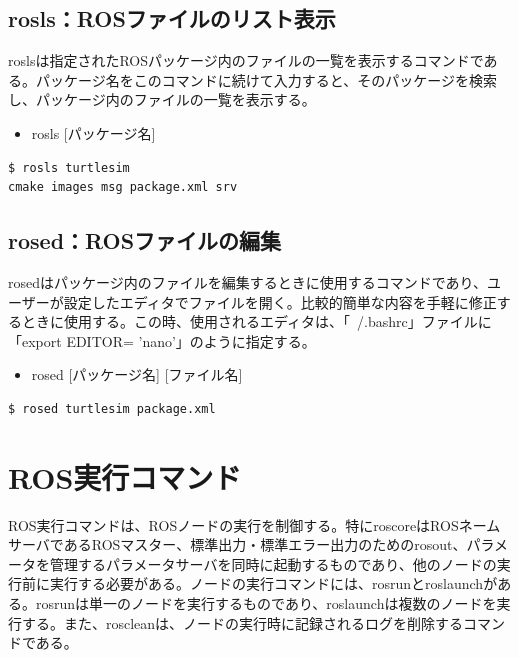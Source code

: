 \subsection{rosls：ROSファイルのリスト表示}

roslsは指定されたROSパッケージ内のファイルの一覧を表示するコマンドである。パッケージ名をこのコマンドに続けて入力すると、そのパッケージを検索し、パッケージ内のファイルの一覧を表示する。

\begin{itemize}
\item  rosls [パッケージ名]
\end{itemize}

\begin{lstlisting}[language=ROS]
$ rosls turtlesim
cmake images msg package.xml srv
\end{lstlisting}

\subsection{rosed：ROSファイルの編集}

rosedはパッケージ内のファイルを編集するときに使用するコマンドであり、ユーザーが設定したエディタでファイルを開く。比較的簡単な内容を手軽に修正するときに使用する。この時、使用されるエディタは、「~/.bashrc」ファイルに「export EDITOR= 'nano'」のように指定する。

\begin{itemize}
\item   rosed [パッケージ名] [ファイル名]
\end{itemize}

\begin{lstlisting}[language=ROS]
$ rosed turtlesim package.xml
\end{lstlisting}

\section{ROS実行コマンド}

ROS実行コマンドは、ROSノードの実行を制御する。特にroscoreはROSネームサーバであるROSマスター、標準出力・標準エラー出力のためのrosout、パラメータを管理するパラメータサーバを同時に起動するものであり、他のノードの実行前に実行する必要がある。ノードの実行コマンドには、rosrunとroslaunchがある。rosrunは単一のノードを実行するものであり、roslaunchは複数のノードを実行する。また、roscleanは、ノードの実行時に記録されるログを削除するコマンドである。

